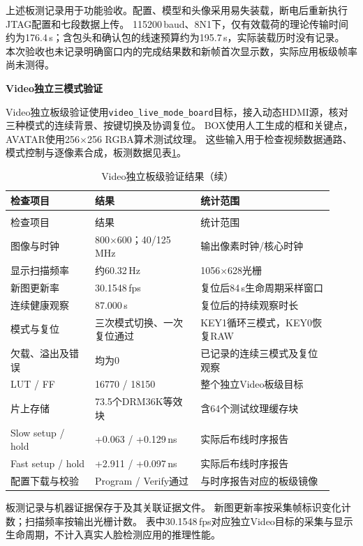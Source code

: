 上述板测记录用于功能验收。配置、模型和头像采用易失装载，断电后重新执行JTAG配置和七段数据上传。
115200\,baud、8N1下，仅有效载荷的理论传输时间约为176.4\,s；含包头和确认包的线速预算约为195.7\,s，实际装载历时没有记录。
本次验收也未记录明确窗口内的完成结果数和新帧首次显示数，实际应用板级帧率尚未测得。

\noindent\textbf{Video独立三模式验证}\par

Video独立板级验证使用\texttt{video\_live\_mode\_board}目标，接入动态HDMI源，核对三种模式的连续背景、按键切换及协调复位。
BOX使用人工生成的框和关键点，AVATAR使用256$\times$256 RGBA算术测试纹理。
这些输入用于检查视频数据通路、模式控制与逐像素合成，板测数据见表\ref{tbl:video-board-results}。

\begin{reporttable}
\begin{longtable}{@{}p{0.24\linewidth}p{0.30\linewidth}p{0.38\linewidth}@{}}
\caption{Video独立板级验证结果}\label{tbl:video-board-results}\\
\toprule
检查项目 & 结果 & 统计范围 \\
\midrule
\endfirsthead
\caption[]{Video独立板级验证结果（续）}\\
\toprule
检查项目 & 结果 & 统计范围 \\
\midrule
\endhead
\bottomrule
\endfoot
图像与时钟 & 800$\times$600；40/125\,MHz & 输出像素时钟/核心时钟 \\
显示扫描频率 & 约60.32\,Hz & 1056$\times$628光栅 \\
新图更新率 & 30.1548\,fps & 复位后84\,s生命周期采样窗口 \\
连续健康观察 & 87.000\,s & 复位后的持续观察时长 \\
模式与复位 & 三次模式切换、一次复位通过 & KEY1循环三模式，KEY0恢复RAW \\
欠载、溢出及错误 & 均为0 & 已记录的连续三模式及复位观察 \\
LUT / FF & 16770 / 18150 & 整个独立Video板级目标 \\
片上存储 & 73.5个DRM36K等效块 & 含64个测试纹理缓存块 \\
Slow setup / hold & +0.063 / +0.129\,ns & 实际后布线时序报告 \\
Fast setup / hold & +2.911 / +0.097\,ns & 实际后布线时序报告 \\
配置下载与校验 & Program / Verify通过 & 与时序报告对应的板级镜像 \\
\end{longtable}
\end{reporttable}

板测记录与机器证据保存于及其关联证据文件。
新图更新率按采集帧标识变化计数；扫描频率按输出光栅计数。
表中30.1548\,fps对应独立Video目标的采集与显示生命周期，不计入真实人脸检测应用的推理性能。


